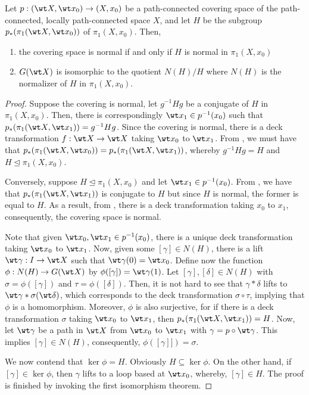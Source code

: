 \begin{theorem}
    Let $p: (\wt X,\wt x_0)\to(X,x_0)$ be a path-connected covering space of the path-connected, locally path-connected space $X$, and let $H$ be the subgroup $p_*(\pi_1(\wt X,\wt x_0))$ of $\pi_1(X,x_0)$. Then, 
    \begin{enumerate}[label=(\alph*)]
        \item the covering space is normal if and only if $H$ is normal in $\pi_1(X,x_0)$ 
        \item $G(\wt X)$ is isomorphic to the quotient $N(H)/H$ where $N(H)$ is the normalizer of $H$ in $\pi_1(X,x_0)$.
    \end{enumerate}
\end{theorem}
\begin{proof}
    Suppose the covering is normal, let $g^{-1}Hg$ be a conjugate of $H$ in $\pi_1(X,x_0)$. Then, there is correspondingly $\wt x_1\in p^{-1}(x_0)$ such that $p_*(\pi_1(\wt X,\wt x_1)) = g^{-1}Hg$. Since the covering is normal, there is a deck transformation $f:\wt X\to\wt X$ taking $\wt x_0$ to $\wt x_1$. From , we must have that $p_*(\pi_1(\wt X,\wt x_0)) = p_*(\pi_1(\wt X,\wt x_1))$, whereby $g^{-1}Hg = H$ and $H\unlhd\pi_1(X,x_0)$.

    Conversely, suppose $H\unlhd\pi_1(X,x_0)$ and let $\wt x_1\in p^{-1}(x_0)$. From , we have that $p_*(\pi_1(\wt X,\wt x_1))$ is conjugate to $H$ but since $H$ is normal, the former is equal to $H$. As a result, from , there is a deck transformation taking $x_0$ to $x_1$, consequently, the covering space is normal.

    Note that given $\wt x_0,\wt x_1\in p^{-1}(x_0)$, there is a unique deck transformation taking $\wt x_0$ to $\wt x_1$. Now, given some $[\gamma]\in N(H)$, there is a lift $\wt\gamma: I\to\wt X$ such that $\wt\gamma(0) = \wt x_0$. Define now the function $\phi: N(H)\to G(\wt X)$ by $\phi([\gamma]) = \wt\gamma(1)$. Let $[\gamma],[\delta]\in N(H)$ with $\sigma = \phi([\gamma])$ and $\tau = \phi([\delta])$. Then, it is not hard to see that $\gamma * \delta$ lifts to $\wt\gamma * \sigma(\wt\delta)$, which corresponds to the deck transformation $\sigma\circ\tau$, implying that $\phi$ is a homomorphism. Moreover, $\phi$ is also surjective, for if there is a deck transformation $\sigma$ taking $\wt x_0$ to $\wt x_1$, then $p_*(\pi_1(\wt X,\wt x_1)) = H$. Now, let $\wt\gamma$ be a path in $\wt X$ from $\wt x_0$ to $\wt x_1$ with $\gamma = p\circ\wt\gamma$. This implies $[\gamma]\in N(H)$, consequently, $\phi([\gamma]]) = \sigma$.

    We now contend that $\ker\phi = H$. Obviously $H\subseteq\ker\phi$. On the other hand, if $[\gamma]\in\ker\phi$, then $\gamma$ lifts to a loop based at $\wt x_0$, whereby, $[\gamma]\in H$. The proof is finished by invoking the first isomorphism theorem.
\end{proof}

